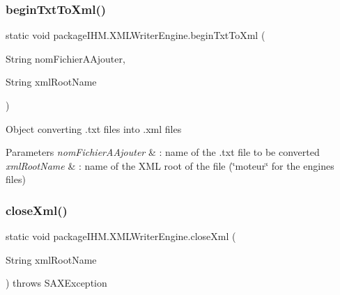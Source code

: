 \subsubsection{\texorpdfstring{begin\+Txt\+To\+Xml()}{beginTxtToXml()}}
{\footnotesize\ttfamily static void package\+I\+H\+M.\+X\+M\+L\+Writer\+Engine.\+begin\+Txt\+To\+Xml (\begin{DoxyParamCaption}\item[{String}]{nom\+Fichier\+A\+Ajouter,  }\item[{String}]{xml\+Root\+Name }\end{DoxyParamCaption})\hspace{0.3cm}{\ttfamily [static]}}

Object converting .txt files into .xml files 
\begin{DoxyParams}{Parameters}
{\em nom\+Fichier\+A\+Ajouter} & \+: name of the .txt file to be converted \\
\hline
{\em xml\+Root\+Name} & \+: name of the X\+ML root of the file (\char`\"{}moteur\char`\"{} for the engines files) \\
\hline
\end{DoxyParams}
\mbox{\label{classpackage_i_h_m_1_1_x_m_l_writer_engine_a7f0d2ba3ee92e5dd2297f7b4c37eb756}} 
\subsubsection{\texorpdfstring{close\+Xml()}{closeXml()}}
{\footnotesize\ttfamily static void package\+I\+H\+M.\+X\+M\+L\+Writer\+Engine.\+close\+Xml (\begin{DoxyParamCaption}\item[{String}]{xml\+Root\+Name }\end{DoxyParamCaption}) throws S\+A\+X\+Exception\hspace{0.3cm}{\ttfamily [static]}}

\mbox{\label{classpackage_i_h_m_1_1_x_m_l_writer_engine_a232a93b9139813d46e3124712864054d}} 
